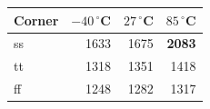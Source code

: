 \begin{tabular}{lrrr}\toprule
Corner & $-40\,^\circ$C & $27\,^\circ$C & $85\,^\circ$C \\\midrule
ss & 1633 & 1675 & \textbf{\textcolor{warn}{2083}} \\
tt & 1318 & 1351 & 1418 \\
ff & 1248 & 1282 & 1317 \\
\bottomrule\end{tabular}
